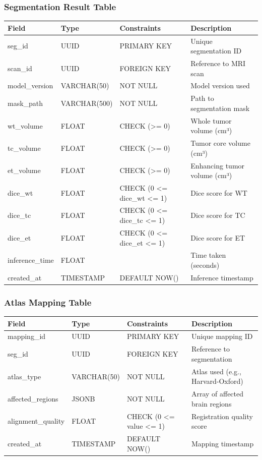\documentclass[12pt,a4paper]{article}
\begin{document}
\subsubsection{Segmentation Result Table}
\begin{table}[H]
\centering
\begin{tabularx}{\textwidth}{|l|l|l|X|}
\hline
\textbf{Field} & \textbf{Type} & \textbf{Constraints} & \textbf{Description} \\
\hline
seg\_id & UUID & PRIMARY KEY & Unique segmentation ID \\
scan\_id & UUID & FOREIGN KEY & Reference to MRI scan \\
model\_version & VARCHAR(50) & NOT NULL & Model version used \\
mask\_path & VARCHAR(500) & NOT NULL & Path to segmentation mask \\
wt\_volume & FLOAT & CHECK (>= 0) & Whole tumor volume (cm³) \\
tc\_volume & FLOAT & CHECK (>= 0) & Tumor core volume (cm³) \\
et\_volume & FLOAT & CHECK (>= 0) & Enhancing tumor volume (cm³) \\
dice\_wt & FLOAT & CHECK (0 <= dice\_wt <= 1) & Dice score for WT \\
dice\_tc & FLOAT & CHECK (0 <= dice\_tc <= 1) & Dice score for TC \\
dice\_et & FLOAT & CHECK (0 <= dice\_et <= 1) & Dice score for ET \\
inference\_time & FLOAT & & Time taken (seconds) \\
created\_at & TIMESTAMP & DEFAULT NOW() & Inference timestamp \\
\hline
\end{tabularx}
\end{table}

\subsubsection{Atlas Mapping Table}
\begin{table}[H]
\centering
\begin{tabularx}{\textwidth}{|l|l|l|X|}
\hline
\textbf{Field} & \textbf{Type} & \textbf{Constraints} & \textbf{Description} \\
\hline
mapping\_id & UUID & PRIMARY KEY & Unique mapping ID \\
seg\_id & UUID & FOREIGN KEY & Reference to segmentation \\
atlas\_type & VARCHAR(50) & NOT NULL & Atlas used (e.g., Harvard-Oxford) \\
affected\_regions & JSONB & NOT NULL & Array of affected brain regions \\
alignment\_quality & FLOAT & CHECK (0 <= value <= 1) & Registration quality score \\
created\_at & TIMESTAMP & DEFAULT NOW() & Mapping timestamp \\
\hline
\end{tabularx}
\end{table}
\end{document}
